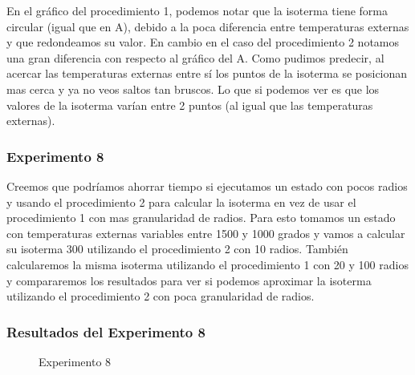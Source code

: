 \par En el gráfico del procedimiento 1, podemos notar que la isoterma tiene forma circular (igual que en A), debido a la poca diferencia entre temperaturas externas y que redondeamos su valor. En cambio en el caso del procedimiento 2 notamos una gran diferencia con respecto al gráfico del A. Como pudimos predecir, al acercar las temperaturas externas entre sí los puntos de la isoterma se posicionan mas cerca y ya no veos saltos tan bruscos. Lo que si podemos ver es que los valores de la isoterma varían entre 2 puntos (al igual que las temperaturas externas).

\subsubsection{Experimento 8}
\par Creemos que podríamos ahorrar tiempo si ejecutamos un estado con pocos radios y usando el procedimiento 2 para calcular la isoterma en vez de usar el procedimiento 1 con mas granularidad de radios. Para esto tomamos un estado con temperaturas externas variables entre 1500 y 1000 grados y vamos a calcular su isoterma 300 utilizando el procedimiento 2 con 10 radios. También calcularemos la misma isoterma utilizando el procedimiento 1 con 20 y 100 radios y compararemos los resultados para ver si podemos aproximar la isoterma utilizando el procedimiento 2 con poca granularidad de radios.

\subsubsection{Resultados del Experimento 8}

\begin{figure}[ht]
\begin{center}
\caption{Experimento 8}
\end{center}
\end{figure}

